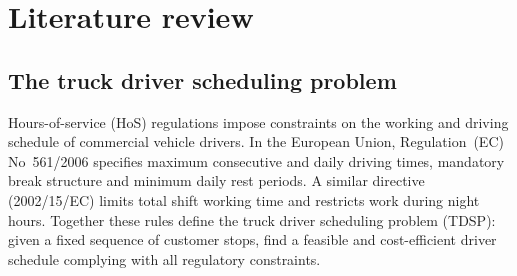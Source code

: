 \documentclass[preprint,12pt,3p]{elsarticle}
\begin{document}
\section{Literature review} \label{sec:litreview}
\subsection{The truck driver scheduling problem}
Hours-of-service (HoS) regulations impose constraints on the working and driving schedule of commercial vehicle drivers. In the European Union, Regulation~(EC) No~561/2006 \citep{noauthor_regulation_2006} specifies maximum consecutive and daily driving times, mandatory break structure and minimum daily rest periods. A similar directive (2002/15/EC) limits total shift working time and restricts work during night hours. Together these rules define the truck driver scheduling problem (TDSP): given a fixed sequence of customer stops, find a feasible and cost-efficient driver schedule complying with all regulatory constraints.
\end{document}
